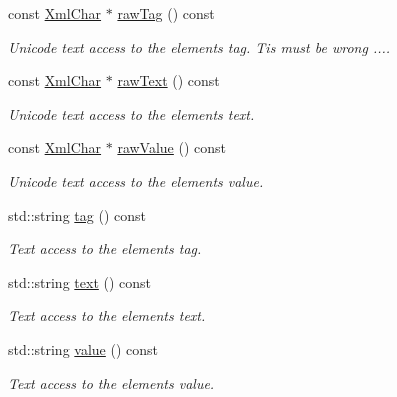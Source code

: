 \begin{DoxyCompactItemize}
const \hyperlink{namespace_d_d4hep_1_1_x_m_l_a09e5d9cc86ed782f6826dfe0778c1815}{Xml\+Char} $\ast$ \hyperlink{class_d_d4hep_1_1_x_m_l_1_1_handle__t_ac1ff8abb319ae16ce48262bf012c01be}{raw\+Tag} () const
\begin{DoxyCompactList}\small\item\em Unicode text access to the element\textquotesingle{}s tag. Tis must be wrong .... \end{DoxyCompactList}\item 
const \hyperlink{namespace_d_d4hep_1_1_x_m_l_a09e5d9cc86ed782f6826dfe0778c1815}{Xml\+Char} $\ast$ \hyperlink{class_d_d4hep_1_1_x_m_l_1_1_handle__t_a68f5092f927315bcde262310a750d2a0}{raw\+Text} () const
\begin{DoxyCompactList}\small\item\em Unicode text access to the element\textquotesingle{}s text. \end{DoxyCompactList}\item 
const \hyperlink{namespace_d_d4hep_1_1_x_m_l_a09e5d9cc86ed782f6826dfe0778c1815}{Xml\+Char} $\ast$ \hyperlink{class_d_d4hep_1_1_x_m_l_1_1_handle__t_a1cac092f53be7ae14a2282655acef33d}{raw\+Value} () const
\begin{DoxyCompactList}\small\item\em Unicode text access to the element\textquotesingle{}s value. \end{DoxyCompactList}\item 
std\+::string \hyperlink{class_d_d4hep_1_1_x_m_l_1_1_handle__t_ac935379eb28cd33bc36f19c68da66143}{tag} () const
\begin{DoxyCompactList}\small\item\em Text access to the element\textquotesingle{}s tag. \end{DoxyCompactList}\item 
std\+::string \hyperlink{class_d_d4hep_1_1_x_m_l_1_1_handle__t_aea331b719cb6948a414f4cd1040fc2a5}{text} () const
\begin{DoxyCompactList}\small\item\em Text access to the element\textquotesingle{}s text. \end{DoxyCompactList}\item 
std\+::string \hyperlink{class_d_d4hep_1_1_x_m_l_1_1_handle__t_a6ff80f9cd5e8424a557db10ac2616bbe}{value} () const
\begin{DoxyCompactList}\small\item\em Text access to the element\textquotesingle{}s value. \end{DoxyCompactList}\item 

\end{DoxyCompactItemize}
